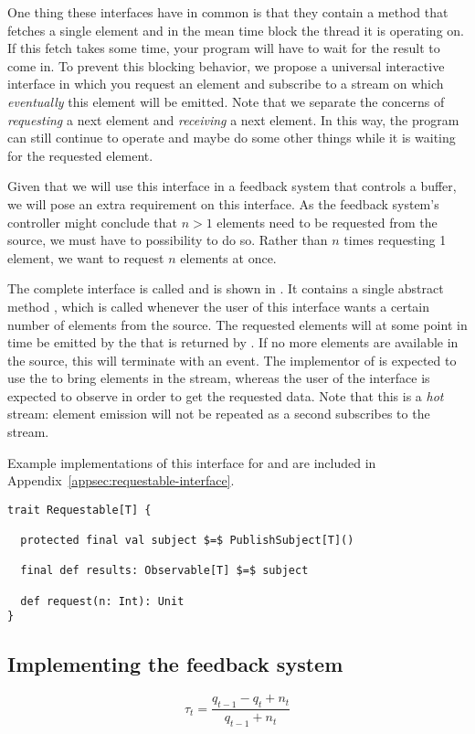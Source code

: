 One thing these interfaces have in common is that they contain a method that fetches a single element and in the mean time block the thread it is operating on. If this fetch takes some time, your program will have to wait for the result to come in. To prevent this blocking behavior, we propose a universal interactive interface in which you request an element and subscribe to a stream on which \textit{eventually} this element will be emitted. Note that we separate the concerns of \textit{requesting} a next element and \textit{receiving} a next element. In this way, the program can still continue to operate and maybe do some other things while it is waiting for the requested element.

Given that we will use this interface in a feedback system that controls a buffer, we will pose an extra requirement on this interface. As the feedback system's controller might conclude that $n > 1$ elements need to be requested from the source, we must have to possibility to do so. Rather than $n$ times requesting 1 element, we want to request $n$ elements at once.

The complete interface is called  and is shown in . It contains a single abstract method , which is called whenever the user of this interface wants a certain number of elements from the source. The requested elements will at some point in time be emitted by the \obs that is returned by . If no more elements are available in the source, this \obs will terminate with an  event. The implementor of  is expected to use the  to bring elements in the stream, whereas the user of the interface is expected to observe  in order to get the requested data. Note that this is a \emph{hot} stream: element emission will not be repeated as a second \obv subscribes to the stream.

Example implementations of this interface for \itr and  are included in Appendix~\ref{appsec:requestable-interface}.

\begin{minipage}{\linewidth}
\begin{lstlisting}[style=ScalaStyle, caption={Universal, interactive interface used in the feedback system}, label={lst:universal-interactive-interface}]
trait Requestable[T] {

  protected final val subject $=$ PublishSubject[T]()

  final def results: Observable[T] $=$ subject

  def request(n: Int): Unit
}
\end{lstlisting}
\end{minipage}

\subsection{Implementing the feedback system}

\begin{equation}
\tau_t = \frac{q_{t-1} - q_t + n_t}{q_{t-1} + n_t}
\end{equation}
